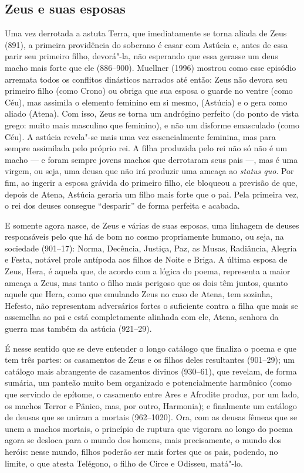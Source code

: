 \subsection{Zeus e suas esposas}

Uma vez derrotada a astuta Terra, que imediatamente se torna aliada de
Zeus (891), a primeira providência do soberano é casar com Astúcia e,
antes de essa parir seu primeiro filho, devorá"-la, não esperando que
essa gerasse um deus macho mais forte que ele (886--900). Muellner (1996)
mostrou como esse episódio arremata todos os conflitos dinásticos
narrados até então: Zeus não devora seu primeiro filho (como Crono) ou
obriga que sua esposa o guarde no ventre (como Céu), mas assimila o
elemento feminino em si mesmo, (Astúcia) e o gera como aliado (Atena).
Com isso, Zeus se torna um andrógino perfeito (do ponto de vista grego:
muito mais masculino que feminino), e não um disforme emasculado (como
Céu). A astúcia revela"-se mais uma vez essencialmente feminina, mas para
sempre assimilada pelo próprio rei. A filha produzida pelo rei não só
não é um macho --- e foram sempre jovens machos que derrotaram seus pais
---, mas é uma virgem, ou seja, uma deusa que não irá produzir uma ameaça
ao \emph{status quo}. Por fim, ao ingerir a esposa grávida do primeiro
filho, ele bloqueou a previsão de que, depois de Atena, Astúcia geraria
um filho mais forte que o pai. Pela primeira vez, o rei dos deuses
consegue ``desparir'' de forma perfeita e acabada.

E somente agora nasce, de Zeus e várias de suas esposas, uma linhagem de
deuses responsáveis pelo que há de bom no cosmo propriamente humano, ou
seja, na sociedade (901--17): Norma, Decência, Justiça, Paz, as Musas,
Radiância, Alegria e Festa, notável prole antípoda aos filhos de Noite e
Briga. A última esposa de Zeus, Hera, é aquela que, de acordo com a
lógica do poema, representa a maior ameaça a Zeus, mas tanto o filho
mais perigoso que os dois têm juntos, quanto aquele que Hera, como que
emulando Zeus no caso de Atena, tem sozinha, Hefesto, não representam
adversários fortes o suficiente contra a filha que mais se assemelha ao
pai e está completamente alinhada com ele, Atena, senhora da guerra mas
também da astúcia (921--29).

É nesse sentido que se deve entender o longo catálogo que finaliza o
poema e que tem três partes: os casamentos de Zeus e os filhos deles
resultantes (901--29); um catálogo mais abrangente de casamentos divinos
(930--61), que revelam, de forma sumária, um panteão muito bem organizado
e potencialmente harmônico (como que servindo de epítome, o casamento
entre Ares e Afrodite produz, por um lado, os machos Terror e Pânico,
mas, por outro, Harmonia); e finalmente um catálogo de deusas que se
uniram a mortais (962--1020). Ora, com as deusas fêmeas que se unem a
machos mortais, o princípio de ruptura que vigorara ao longo do poema
agora se desloca para o mundo dos homens, mais precisamente, o mundo dos
heróis: nesse mundo, filhos poderão ser mais fortes que os pais,
podendo, no limite, o que atesta Telégono, o filho de Circe e Odisseu,
matá"-lo.

